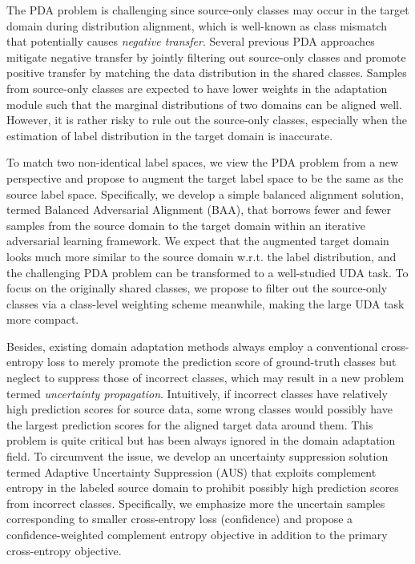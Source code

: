 \documentclass[runningheads]{llncs}
\begin{document}
The PDA problem is challenging since source-only classes may occur in the target domain during distribution alignment, which is well-known as class mismatch that potentially causes \textit{negative transfer}. 
Several previous PDA approaches \cite{cao2018partialb,cao2018partial} mitigate negative transfer by jointly filtering out source-only classes and promote positive transfer by matching the data distribution in the shared classes.
Samples from source-only classes are expected to have lower weights in the adaptation module such that the marginal distributions of two domains can be aligned well.
However, it is rather risky to rule out the source-only classes, especially when the estimation of label distribution in the target domain is inaccurate.


To match two non-identical label spaces, we view the PDA problem from a new perspective and propose to augment the target label space to be the same as the source label space.
Specifically, we develop a simple balanced alignment solution, termed Balanced Adversarial Alignment (BAA), that borrows fewer and fewer samples from the source domain to the target domain within an iterative adversarial learning framework.
We expect that the augmented target domain looks much more similar to the source domain w.r.t. the label distribution, and the challenging PDA problem can be transformed to a well-studied UDA task.
To focus on the originally shared classes, we propose to filter out the source-only classes via a class-level weighting scheme meanwhile, making the large UDA task more compact.


Besides, existing domain adaptation methods always employ a conventional cross-entropy loss to merely promote the prediction score of ground-truth classes but neglect to suppress those of incorrect classes, which may result in a new problem termed \textit{uncertainty propagation}.
Intuitively, if incorrect classes have relatively high prediction scores for source data, some wrong classes would possibly have the largest prediction scores for the aligned target data around them.
This problem is quite critical but has been always ignored in the domain adaptation field.	
To circumvent the issue, we develop an uncertainty suppression solution termed Adaptive Uncertainty Suppression (AUS) that exploits complement entropy \cite{chen2019complement} in the labeled source domain to prohibit possibly high prediction scores from incorrect classes.
Specifically, we emphasize more the uncertain samples corresponding to smaller cross-entropy loss (confidence) and propose a confidence-weighted complement entropy objective in addition to the primary cross-entropy objective.
\end{document}
